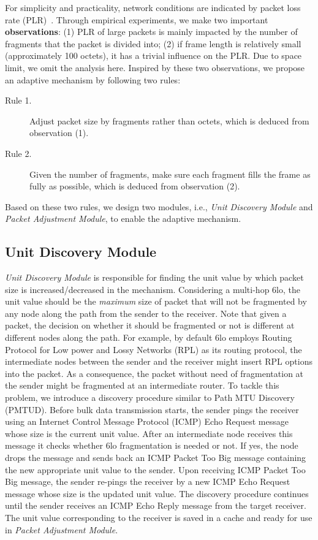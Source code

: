 \documentclass[runningheads,a4paper]{llncs}
\begin{document}
For simplicity and practicality, network conditions are indicated by packet loss rate (PLR)~\cite{Bacc2012}. Through empirical experiments, we make two important \textbf{observations}: (1) PLR of large packets is mainly impacted by the number of fragments that the packet is divided into; (2) if frame length is relatively small (approximately 100 octets), it has a trivial influence on the PLR. Due to space limit, we omit the analysis here. Inspired by these two observations, we propose an adaptive mechanism by following two rules:
\begin{description}
	\item[Rule 1.] Adjust packet size by fragments rather than octets, which is deduced from observation (1).
	\item[Rule 2.] Given the number of fragments, make sure each fragment fills the frame as fully as possible, which is deduced from observation (2).
\end{description}
Based on these two rules, we design two modules, i.e., \emph{Unit Discovery Module} and \emph{Packet Adjustment Module}, to enable the adaptive mechanism.

\subsection{Unit Discovery Module}
\emph{Unit Discovery Module} is responsible for finding the unit value by which packet size is increased/decreased in the mechanism. Considering a multi-hop 6lo, the unit value should be the \emph{maximum} size of packet that will not be fragmented by any node along the path from the sender to the receiver. Note that given a packet, the decision on whether it should be fragmented or not is different at different nodes along the path. For example, by default 6lo employs Routing Protocol for Low power and Lossy Networks (RPL) as its routing protocol, the intermediate nodes between the sender and the receiver might insert RPL options into the packet. As a consequence, the packet without need of fragmentation at the sender might be fragmented at an intermediate router. To tackle this problem, we introduce a discovery procedure similar to Path MTU Discovery (PMTUD). Before bulk data transmission starts, the sender pings the receiver using an Internet Control Message Protocol (ICMP) Echo Request message whose size is the current unit value. After an intermediate node receives this message it checks whether 6lo fragmentation is needed or not. If yes, the node drops the message and sends back an ICMP Packet Too Big message containing the new appropriate unit value to the sender. Upon receiving ICMP Packet Too Big message, the sender re-pings the receiver by a new ICMP Echo Request message whose size is the updated unit value. The discovery procedure continues until the sender receives an ICMP Echo Reply message from the target receiver. The unit value corresponding to the receiver is saved in a cache and ready for use in \emph{Packet Adjustment Module}.
\end{document}
